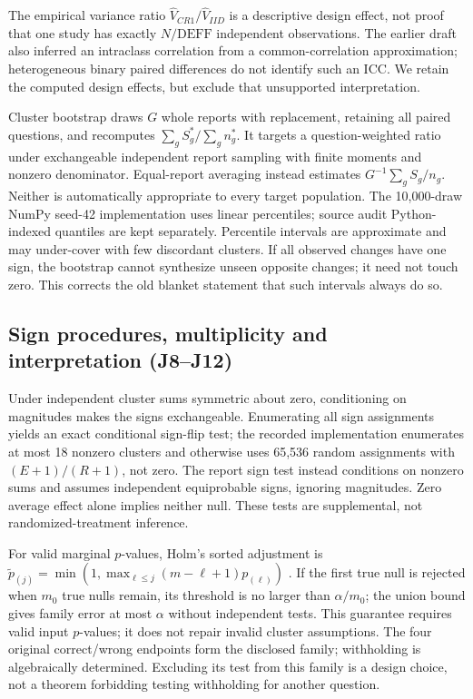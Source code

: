 The empirical variance ratio $\widehat V_{CR1}/\widehat V_{IID}$ is a descriptive design effect, not proof that one study has exactly $N/\mathrm{DEFF}$ independent observations. The earlier draft also inferred an intraclass correlation from a common-correlation approximation; heterogeneous binary paired differences do not identify such an ICC. We retain the computed design effects, but exclude that unsupported interpretation.

Cluster bootstrap draws $G$ whole reports with replacement, retaining all paired questions, and recomputes $\sum_g S_g^*/\sum_g n_g^*$. It targets a question-weighted ratio under exchangeable independent report sampling with finite moments and nonzero denominator. Equal-report averaging instead estimates $G^{-1}\sum_g S_g/n_g$. Neither is automatically appropriate to every target population. The 10,000-draw NumPy seed-42 implementation uses linear percentiles; source audit Python-indexed quantiles are kept separately. Percentile intervals are approximate and may under-cover with few discordant clusters. If all observed changes have one sign, the bootstrap cannot synthesize unseen opposite changes; it need not touch zero. This corrects the old blanket statement that such intervals always do so.

\subsection{Sign procedures, multiplicity and interpretation (J8--J12)}
Under independent cluster sums symmetric about zero, conditioning on magnitudes makes the signs exchangeable. Enumerating all sign assignments yields an exact conditional sign-flip test; the recorded implementation enumerates at most 18 nonzero clusters and otherwise uses 65,536 random assignments with $(E+1)/(R+1)$, not zero. The report sign test instead conditions on nonzero sums and assumes independent equiprobable signs, ignoring magnitudes. Zero average effect alone implies neither null. These tests are supplemental, not randomized-treatment inference.

For valid marginal $p$-values, Holm's sorted adjustment is $\widetilde p_{(j)}=\min(1,\max_{\ell\leq j}(m-\ell+1)p_{(\ell)})$ \citep{holm}. If the first true null is rejected when $m_0$ true nulls remain, its threshold is no larger than $\alpha/m_0$; the union bound gives family error at most $\alpha$ without independent tests. This guarantee requires valid input $p$-values; it does not repair invalid cluster assumptions. The four original correct/wrong endpoints form the disclosed family; withholding is algebraically determined. Excluding its test from this family is a design choice, not a theorem forbidding testing withholding for another question.

